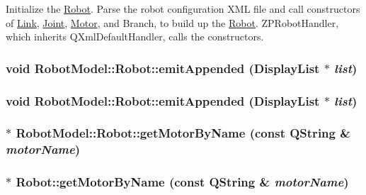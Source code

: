 Initialize the \hyperlink{class_robot_model_1_1_robot}{Robot}. Parse the robot configuration XML file and call constructors of \hyperlink{class_robot_model_1_1_link}{Link}, \hyperlink{class_robot_model_1_1_joint}{Joint}, \hyperlink{class_robot_model_1_1_motor}{Motor}, and Branch, to build up the \hyperlink{class_robot_model_1_1_robot}{Robot}. ZPRobotHandler, which inherits QXmlDefaultHandler, calls the constructors. \hypertarget{class_robot_model_1_1_robot_a4c006ead68b20137a28276920103667c}{
\subsubsection[{emitAppended}]{\setlength{\rightskip}{0pt plus 5cm}void RobotModel::Robot::emitAppended ({\bf DisplayList} $\ast$ {\em list})}}
\label{class_robot_model_1_1_robot_a4c006ead68b20137a28276920103667c}
\hypertarget{class_robot_model_1_1_robot_a4c006ead68b20137a28276920103667c}{
\subsubsection[{emitAppended}]{\setlength{\rightskip}{0pt plus 5cm}void RobotModel::Robot::emitAppended ({\bf DisplayList} $\ast$ {\em list})}}
\label{class_robot_model_1_1_robot_a4c006ead68b20137a28276920103667c}
\hypertarget{class_robot_model_1_1_robot_a999c5f6c15891436fdfb97517d600a7a}{
\subsubsection[{getMotorByName}]{$\ast$ RobotModel::Robot::getMotorByName (const QString \& {\em motorName})}}
\label{class_robot_model_1_1_robot_a999c5f6c15891436fdfb97517d600a7a}
\hypertarget{class_robot_model_1_1_robot_a41d959b8a9f469ee1caa5e3881a9445f}{
\subsubsection[{getMotorByName}]{ $\ast$ Robot::getMotorByName (const QString \& {\em motorName})}}
